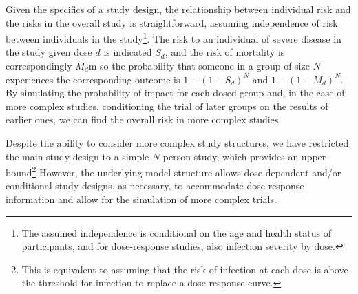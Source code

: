 \documentclass{article}
\begin{document}
Given the specifics of a study design, the relationship between individual risk and the risks in the overall study is straightforward, assuming independence of risk between individuals in the study\footnote{The assumed independence is conditional on the age and health status of participants, and for dose-response studies, also infection severity by dose.}. The risk to an individual of severe disease in the study given dose $d$ is indicated $S_d$, and the risk of mortality is correspondingly $M_d$m so the probability that someone in a group of size $N$ experiences the corresponding outcome is $1-(1-S_d)^N$ and $1-(1-M_d)^N$. By simulating the probability of impact for each dosed group and, in the case of more complex studies, conditioning the trial of later groups on the results of earlier ones, we can find the overall risk in more complex studies.

Despite the ability to consider more complex study structures, we have restricted the main study design to a simple $N$-person study, which provides an upper bound\footnote{ This is equivalent to assuming that the risk of infection at each dose is above the threshold for infection to replace a dose-response curve.} However, the underlying model structure allows dose-dependent and/or conditional study designs, as necessary, to accommodate dose response information and allow for the simulation of more complex trials.

\end{document}

